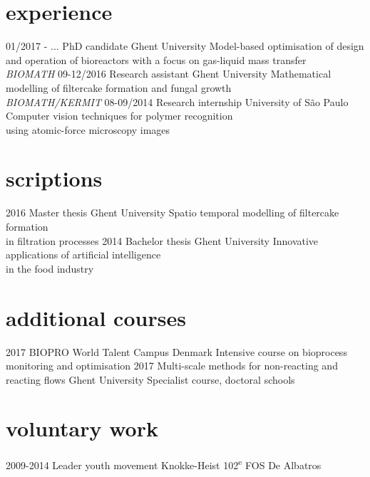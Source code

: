 \documentclass[]{friggeri-cv}
\begin{document}
\section{experience}
\begin{entrylist}
  \entry
    {01/2017 - ...}
    {PhD candidate}
    {Ghent University}
    {Model-based optimisation of design and operation of bioreactors with a focus on gas-liquid mass transfer \\ \textit{BIOMATH}}
    \entry
    {09-12/2016}
    {Research assistant}
    {Ghent University}
    {Mathematical modelling of filtercake formation and fungal growth \\{\textit{BIOMATH/KERMIT}}}
    \entry
    {08-09/2014}
    {Research internship}
    {University of S\~{a}o Paulo}
    {Computer vision techniques for polymer recognition\\ using atomic-force microscopy images}
\end{entrylist}

\section{scriptions}
\begin{entrylist}
  \entry
    {2016}
    {Master thesis}
    {Ghent University}
    {Spatio temporal modelling of filtercake formation\\ in filtration processes}
  \entry
    {2014}
    {Bachelor thesis}
    {Ghent University}
    {Innovative applications of artificial intelligence\\ in the food industry}
\end{entrylist}

\section{additional courses}
\begin{entrylist}
  \entry
    {2017}
    {BIOPRO World Talent Campus}
    {Denmark}
    {Intensive course on bioprocess monitoring and optimisation}
    \entry
    {2017}
    {Multi-scale methods for non-reacting and\\ reacting flows}
    {Ghent University}
    {Specialist course, doctoral schools}
\end{entrylist}

\section{voluntary work}
\begin{entrylist}
 \entry
    {2009-2014}
    {Leader youth movement}
    {Knokke-Heist}
    {102\textsuperscript{e} FOS De Albatros}
\end{entrylist} 
   
\end{document}
